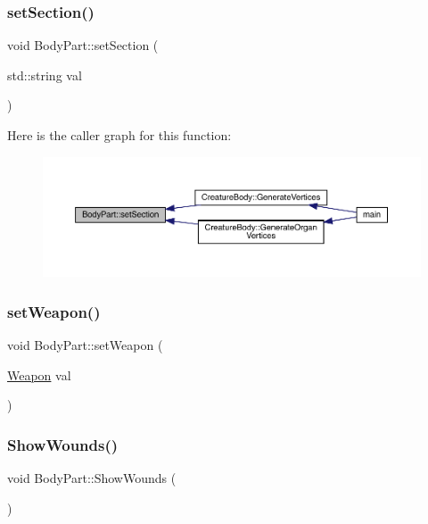 \subsubsection{\texorpdfstring{set\+Section()}{setSection()}}
{\footnotesize\ttfamily void Body\+Part\+::set\+Section (\begin{DoxyParamCaption}\item[{std\+::string}]{val }\end{DoxyParamCaption})}

Here is the caller graph for this function\+:
\nopagebreak
\begin{figure}[H]
\begin{center}
\leavevmode
\includegraphics[width=350pt]{class_body_part_acae2236af2e131dfb8a49b4ca62d0d1f_icgraph}
\end{center}
\end{figure}
\mbox{\label{class_body_part_a12897c5566d467977f7bbbe39665c4f5}} 
\subsubsection{\texorpdfstring{set\+Weapon()}{setWeapon()}}
{\footnotesize\ttfamily void Body\+Part\+::set\+Weapon (\begin{DoxyParamCaption}\item[{\mbox{\hyperlink{class_weapon}{Weapon}}}]{val }\end{DoxyParamCaption})}

\mbox{\label{class_body_part_a59d24b904169031b36cef2f4ba2847f1}} 
\subsubsection{\texorpdfstring{Show\+Wounds()}{ShowWounds()}}
{\footnotesize\ttfamily void Body\+Part\+::\+Show\+Wounds (\begin{DoxyParamCaption}{ }\end{DoxyParamCaption})}



